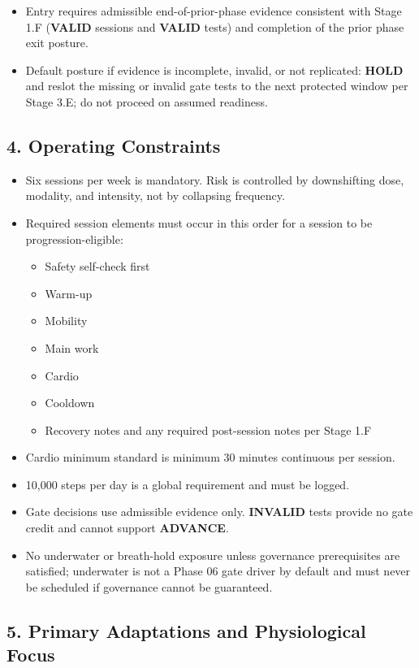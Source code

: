 \documentclass[10pt]{article}
\begin{document}
\begin{itemize}
\item Entry requires admissible end-of-prior-phase evidence consistent with Stage 1.F (\textbf{VALID} sessions and \textbf{VALID} tests) and completion of the prior phase exit posture.
\item Default posture if evidence is incomplete, invalid, or not replicated: \textbf{HOLD} and reslot the missing or invalid gate tests to the next protected window per Stage 3.E; do not proceed on assumed readiness.
\end{itemize}

\subsection*{4. Operating Constraints}

\begin{itemize}
\item Six sessions per week is mandatory. Risk is controlled by downshifting dose, modality, and intensity, not by collapsing frequency.
\item Required session elements must occur in this order for a session to be progression-eligible:
  \begin{itemize}
  \item Safety self-check first
  \item Warm-up
  \item Mobility
  \item Main work
  \item Cardio
  \item Cooldown
  \item Recovery notes and any required post-session notes per Stage 1.F
  \end{itemize}
\item Cardio minimum standard is minimum 30 minutes continuous per session.
\item 10,000 steps per day is a global requirement and must be logged.
\item Gate decisions use admissible evidence only. \textbf{INVALID} tests provide no gate credit and cannot support \textbf{ADVANCE}.
\item No underwater or breath-hold exposure unless governance prerequisites are satisfied; underwater is not a Phase 06 gate driver by default and must never be scheduled if governance cannot be guaranteed.
\end{itemize}

\subsection*{5. Primary Adaptations and Physiological Focus}
\end{document}
